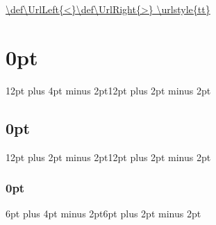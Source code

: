 \DeclareUrlCommand\url{\def\UrlLeft{<}\def\UrlRight{>} \urlstyle{tt}}
\pagestyle{headings}
\setlength{\parskip}{8pt}
\setlength{\parindent}{16pt}

\sloppy

\graphicspath{ {img/} {graph/}}

\newcommand*\rot{\rotatebox[origin=c]{90}}

\makeatletter
\def\@makechapterhead#1{\vspace*{5\p@}
  {\parindent \z@ \raggedright \normalfont
    \ifnum \c@secnumdepth >\m@ne
        \huge\bfseries \@chapapp\space \thechapter
        \par\nobreak
        \vskip 20\p@
    \fi
    \interlinepenalty\@M
    \Huge \bfseries #1\par\nobreak
    \vskip 40\p@
  }}
\def\@makeschapterhead#1{%
  {\parindent \z@ \raggedright
    \normalfont
    \interlinepenalty\@M
    \Huge \bfseries  #1\par\nobreak
    \vskip 40\p@
  }}
\makeatother

\titlespacing\section{0pt}{12pt plus 4pt minus 2pt}{12pt plus 2pt minus 2pt}
\titlespacing\subsection{0pt}{12pt plus 2pt minus 2pt}{12pt plus 2pt minus 2pt}
\titlespacing\subsubsection{0pt}{6pt plus 4pt minus 2pt}{6pt plus 2pt minus 2pt}

